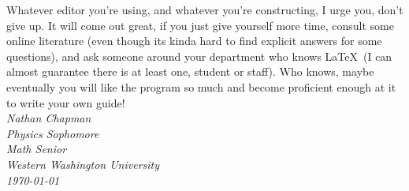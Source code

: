 \documentclass[11pt,letterpaper,twoside,titlepage]{article}
\newcommand{\latex}{\LaTeX \ }
\begin{document}
		Whatever editor you're using, and whatever you're constructing, I urge you, don't give up.  It will come out great, if you just give yourself more time, consult some online literature (even though its kinda hard to find explicit answers for some questions), and ask someone around your department who knows \latex (I can almost guarantee there is at least one,  student or staff).  Who knows, maybe eventually you will like the program so much and become proficient enough at it to write your own guide! \\
		
		\textit{Nathan Chapman \\ Physics Sophomore \\ Math Senior \\ Western Washington University \\ \today}
\end{document}
